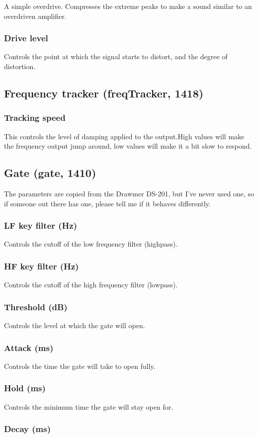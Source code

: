 \documentclass[11pt]{article}
\begin{document}
A simple overdrive. Compresses the extreme peaks to make a sound similar to an overdriven amplifier.\subsubsection*{Drive level}
Controls the point at which the signal starts to distort, and the degree of distortion.\subsection{Frequency tracker (freqTracker, 1418)\label{freqTracker}\label{id1418}}
\subsubsection*{Tracking speed}
This controls the level of damping applied to the output.High values will make the frequency output jump around, low values will make it a bit slow to respond.\subsection{Gate (gate, 1410)\label{gate}\label{id1410}}
The parameters are copied from the Drawmer DS-201, but I've never used one, so if someone out there has one, please tell me if it behaves differently.\subsubsection*{LF key filter (Hz)}
Controls the cutoff of the low frequency filter (highpass).\subsubsection*{HF key filter (Hz)}
Controls the cutoff of the high frequency filter (lowpass).\subsubsection*{Threshold (dB)}
Controls the level at which the gate will open.\subsubsection*{Attack (ms)}
Controls the time the gate will take to open fully.\subsubsection*{Hold (ms)}
Controls the minimum time the gate will stay open for.\subsubsection*{Decay (ms)}
\end{document}
